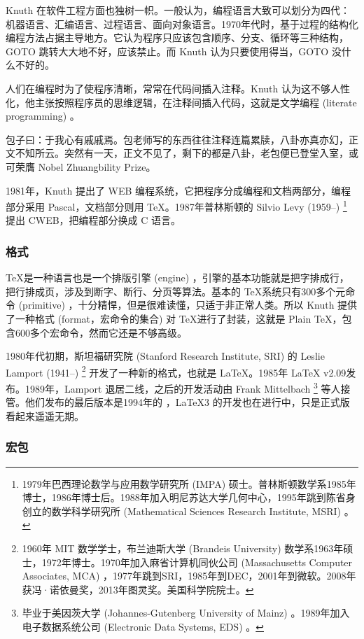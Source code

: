 Knuth 在软件工程方面也独树一帜。一般认为，编程语言大致可以划分为四代：机器语言、汇编语言、过程语言、面向对象语言。1970年代时，基于过程的结构化编程方法占据主导地方。它认为程序只应该包含顺序、分支、循环等三种结构，GOTO 跳转大大地不好，应该禁止。而 Knuth 认为只要使用得当，GOTO 没什么不好的。

人们在编程时为了使程序清晰，常常在代码间插入注释。Knuth 认为这不够人性化，他主张按照程序员的思维逻辑，在注释间插入代码，这就是文学编程 (literate programming) 。

包子曰：于我心有戚戚焉。包老师写的东西往往注释连篇累牍，八卦亦真亦幻，正文不知所云。突然有一天，正文不见了，剩下的都是八卦，老包便已登堂入室，或可荣膺 Nobel Zhuangbility Prize。

1981年，Knuth 提出了 WEB 编程系统，它把程序分成编程和文档两部分，编程部分采用 Pascal，文档部分则用 \TeX。1987年普林斯顿的 Silvio Levy (1959--)\indexLevy{} \footnote{1979年巴西理论数学与应用数学研究所 (IMPA) 硕士。普林斯顿数学系1985年博士，1986年博士后。1988年加入明尼苏达大学几何中心，1995年跳到陈省身创立的数学科学研究所 (Mathematical Sciences Research Institute, MSRI) 。} 提出 CWEB，把编程部分换成 C 语言。

\subsubsection{格式}

\TeX 是一种语言也是一个排版引擎 (engine) ，引擎的基本功能就是把字排成行，把行排成页，涉及到断字、断行、分页等算法。基本的 \TeX 系统只有300多个元命令 (primitive) ，十分精悍，但是很难读懂，只适于非正常人类。所以 Knuth 提供了一种格式 (format，宏命令的集合) 对 \TeX 进行了封装，这就是 Plain \TeX ，包含600多个宏命令，然而它还是不够高级。

1980年代初期，斯坦福研究院 (Stanford Research Institute, SRI) 的 Leslie Lamport (1941--)\indexLamport{} \footnote{1960年 MIT 数学学士，布兰迪斯大学 (Brandeis University) 数学系1963年硕士，1972年博士。1970年加入麻省计算机同伙公司 (Massachusetts Computer Associates, MCA) ，1977年跳到SRI，1985年到DEC，2001年到微软。2008年获冯·诺依曼奖，2013年图灵奖。美国科学院院士。} 开发了一种新的格式，也就是 \LaTeX。1985年 \LaTeX{} v2.09发布。1989年，Lamport 退居二线，之后的开发活动由 Frank Mittelbach\indexMittelbach{} \footnote{毕业于美因茨大学 (Johannes-Gutenberg University of Mainz) 。1989年加入电子数据系统公司 (Electronic Data Systems, EDS) 。} 等人接管。他们发布的最后版本是1994年的 \LaTeXe，\LaTeX 3 的开发也在进行中，只是正式版看起来遥遥无期。

\subsubsection{宏包}

